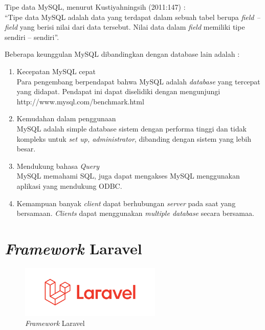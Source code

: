 Tipe data MySQL, menurut Kustiyahningsih (2011:147) : \\
“Tipe data MySQL adalah data yang terdapat dalam sebuah tabel berupa \textit{field – field} yang berisi nilai dari data tersebut. Nilai data dalam \textit{field} memiliki tipe sendiri – sendiri”.

Beberapa keunggulan MySQL dibandingkan dengan database lain adalah \cite{5} :

\begin{enumerate}

\item Kecepatan MySQL cepat \\
Para pengembang berpendapat bahwa MySQL adalah \textit{database} yang tercepat yang didapat. Pendapat ini dapat diselidiki dengan mengunjungi http://www.mysql.com/benchmark.html

\item Kemudahan dalam penggunaan \\
MySQL adalah simple database sistem dengan performa tinggi dan tidak kompleks untuk \textit{set up, administrator}, dibanding dengan sistem yang lebih besar.

\item Mendukung bahasa \textit{Query} \\
MySQL memahami SQL, juga dapat mengakses MySQL menggunakan aplikasi yang mendukung ODBC.

\item Kemampuan banyak \textit{client} dapat berhubungan \textit{server} pada saat yang bersamaan. \textit{Clients} dapat menggunakan \textit{multiple database} secara bersamaa. 

\end{enumerate} 

\section{\textit{Framework} Laravel}

\begin{figure}
	\centering
	\includegraphics[width=0.6\textwidth]
	{pics/laravel.png}
	\caption{\textit{Framework} Laravel}
	\label{fig:31}
\end{figure}

